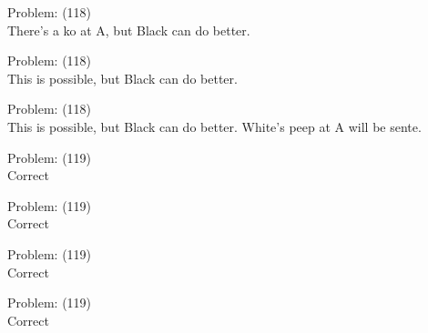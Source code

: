 \documentclass[11pt]{article}
\begin{document}
\begin{minipage}[t]{0.5\textwidth}
  {\centering
  
  Problem: (118)\\
  There's a ko at A, but Black can do better.\\
  }
\end{minipage}
\begin{minipage}[t]{0.5\textwidth}
  {\centering
  
  Problem: (118)\\
  This is possible, but Black can do better.\\
  }
\end{minipage}
\begin{minipage}[t]{0.5\textwidth}
  {\centering
  
  Problem: (118)\\
  This is possible, but Black can do better. White's peep at A will be sente.\\
  }
\end{minipage}
\begin{minipage}[t]{0.5\textwidth}
  {\centering
  
  Problem: (119)\\
  Correct\\
  }
\end{minipage}
\begin{minipage}[t]{0.5\textwidth}
  {\centering
  
  Problem: (119)\\
  Correct\\
  }
\end{minipage}
\begin{minipage}[t]{0.5\textwidth}
  {\centering
  
  Problem: (119)\\
  Correct\\
  }
\end{minipage}
\begin{minipage}[t]{0.5\textwidth}
  {\centering
  
  Problem: (119)\\
  Correct\\
  }
\end{minipage}
\end{document}
